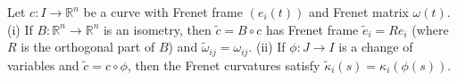 Let $c: I \to \mathbb{R}^n$ be a curve with Frenet frame $(e_i(t))$ and Frenet matrix $\omega(t)$.
(i) If $B: \mathbb{R}^n \to \mathbb{R}^n$ is an isometry, then $\tilde{c} = B \circ c$ has Frenet frame $\tilde{e}_i = R e_i$ (where $R$ is the orthogonal part of $B$) and $\tilde{\omega}_{ij} = \omega_{ij}$.
(ii) If $\phi: J \to I$ is a change of variables and $\tilde{c} = c \circ \phi$, then the Frenet curvatures satisfy $\tilde{\kappa}_i(s) = \kappa_i(\phi(s))$.